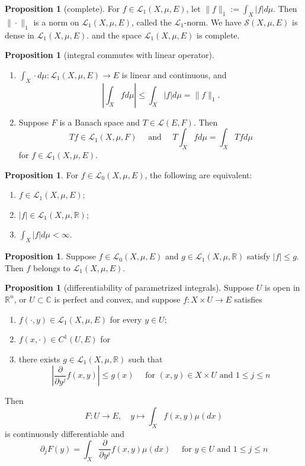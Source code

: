 \documentclass[12pt,a4paper]{book}
\newenvironment{enu}{\begin{enumerate}[(1)]}{\end{enumerate}}
\theoremstyle{definition}
\newtheorem{prop}[defn]{Proposition}
\begin{document}
\begin{prop}[complete]
    For $f \in \mathcal{L}_1(X, \mu, E)$, let $\|f\|_1:=\int_X|f| d \mu$. Then $\|\cdot\|_1$ is a norm on $\mathcal{L}_1(X, \mu, E)$, called the $\mathcal{L}_1$-norm.
    We have $\mathcal{S}(X, \mu, E)$ is dense in $\mathcal{L}_1(X, \mu, E)$.
    and the space $\mathcal{L}_1(X, \mu, E)$ is complete.
\end{prop}
\begin{prop}[integral commutes with linear operator]
\begin{enu}
    \item $\int_X \cdot d \mu: \mathcal{L}_1(X, \mu, E) \rightarrow E$ is linear and continuous, and
    $$
    \left|\int_X f d \mu\right| \leq \int_X|f| d \mu=\|f\|_1 .
    $$
    \item Suppose $F$ is a Banach space and $T \in \mathcal{L}(E, F)$. Then
    $$
    T f \in \mathcal{L}_1(X, \mu, F) \quad \text { and } \quad T \int_X f d \mu=\int_X T f d \mu
    $$
    for $f \in \mathcal{L}_1(X, \mu, E)$.
\end{enu}
\label{Proposition: Intergration commutes with linear transform}
\end{prop}
\begin{prop}
    For $f \in \mathcal{L}_0(X, \mu, E)$, the following are equivalent:
\begin{enu} 
    \item $f \in \mathcal{L}_1(X, \mu, E)$;
    \item $|f| \in \mathcal{L}_1(X, \mu, \mathbb{R})$;
    \item $\int_X|f| d \mu<\infty$.
\end{enu}   
\end{prop}
\begin{prop}
    Suppose $f \in \mathcal{L}_0(X, \mu, E)$ and $g \in \mathcal{L}_1(X, \mu, \mathbb{R})$ satisfy $|f| \leq g$. Then $f$ belongs to $\mathcal{L}_1(X, \mu, E)$.
\end{prop}
\begin{prop}[differentiability of parametrized integrals]
    Suppose $U$ is open in $\mathbb{R}^n$, or $U \subset \mathbb{C}$ is perfect and convex, and suppose $f: X \times U \rightarrow E$ satisfies
\begin{enu} 
    \item $f(\cdot, y) \in \mathcal{L}_1(X, \mu, E)$ for every $y \in U$;
    \item $f(x, \cdot) \in C^1(U, E)$ for 
    \item there exists $g \in \mathcal{L}_1(X, \mu, \mathbb{R})$ such that 
    $$
    \left|\frac{\partial}{\partial y^j} f(x, y)\right| \leq g(x) \quad \text { for }(x, y) \in X \times U \text { and } 1 \leq j \leq n
    $$
\end{enu}
    Then
    $$
    F: U \rightarrow E, \quad y \mapsto \int_X f(x, y) \mu(d x)
    $$
    is continuously differentiable and 
    $$
    \partial_j F(y)=\int_X \frac{\partial}{\partial y^j} f(x, y) \mu(d x) \quad \text { for } y \in U \text { and } 1 \leq j \leq n
    $$
\end{prop}
\end{document}
